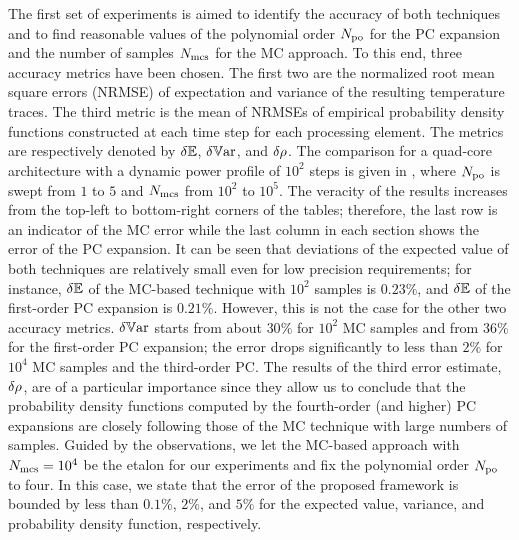 
The first set of experiments is aimed to identify the accuracy of both techniques and to find reasonable values of the polynomial order ${N_\text{po}}$ for the PC expansion and the number of samples $N_\text{mcs}$ for the MC approach. To this end, three accuracy metrics have been chosen. The first two are the normalized root mean square errors (NRMSE) of expectation and variance of the resulting temperature traces. The third metric is the mean of NRMSEs of empirical probability density functions constructed at each time step for each processing element. The metrics are respectively denoted by $\delta\mathbb{E}$, $\delta\mathbb{V}\text{ar}$, and $\delta\rho$. The comparison for a quad-core architecture with a dynamic power profile of $10^2$ steps is given in , where ${N_\text{po}}$ is swept from $1$ to $5$ and $N_\text{mcs}$ from $10^2$ to $10^5$. The veracity of the results increases from the top-left to bottom-right corners of the tables; therefore, the last row is an indicator of the MC error while the last column in each section shows the error of the PC expansion. It can be seen that deviations of the expected value of both techniques are relatively small even for low precision requirements; for instance, $\delta\mathbb{E}$ of the MC-based technique with $10^2$ samples is $0.23\%$, and $\delta\mathbb{E}$ of the first-order PC expansion is $0.21\%$. However, this is not the case for the other two accuracy metrics. $\delta\mathbb{V}\text{ar}$ starts from about $30\%$ for $10^2$ MC samples and from $36\%$ for the first-order PC expansion; the error drops significantly to less than $2\%$ for $10^4$ MC samples and the third-order PC. The results of the third error estimate, $\delta\rho$, are of a particular importance since they allow us to conclude that the probability density functions computed by the fourth-order (and higher) PC expansions are closely following those of the MC technique with large numbers of samples. Guided by the observations, we let the MC-based approach with $N_\text{mcs} = 10^4$ be the etalon for our experiments and fix the polynomial order ${N_\text{po}}$ to four. In this case, we state that the error of the proposed framework is bounded by less than $0.1\%$, $2\%$, and $5\%$ for the expected value, variance, and probability density function, respectively.

